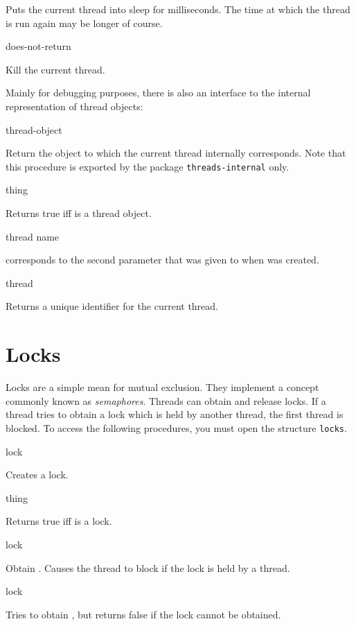 Puts the current thread into sleep for  milliseconds. The
time at which the thread is run again may be longer of course.

 {} {does-not-return}

Kill the current thread. 

Mainly for debugging purposes, there is also an interface to the
internal representation of thread objects:

 {} {thread-object}

Return the object to which the current thread internally corresponds.
Note that this procedure is exported by the package
\texttt{threads-internal} only.

 {thing} {\boolean}

Returns true iff  is a  thread object. 

 {thread} {name}

 corresponds to the second parameter that was given to
 when  was created.

 {thread} {\integer}

Returns a unique identifier for the current thread.

\section{Locks}

Locks are a simple mean for mutual exclusion. They implement a concept
commonly known as \textit{semaphores}. Threads can obtain and release
locks. If a thread tries to obtain a lock which is held by another
thread, the first thread is blocked. To access the following
procedures, you must open the structure \texttt{locks}.

 {} {lock}

Creates a lock. 

 {thing} {\boolean}

Returns true iff  is a lock.

 {lock} {\undefined}

Obtain . Causes the thread to block if the lock is held by
a thread.

 {lock} {\boolean}

Tries to obtain , but returns false if the lock cannot be
obtained.


